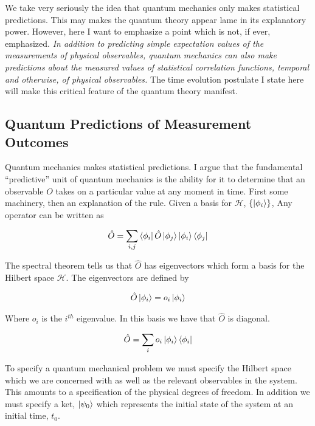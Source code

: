 \documentclass[12pt]{article}
\begin{document}
We take very seriously the idea that quantum mechanics only makes statistical predictions. This may makes the quantum theory appear lame in its explanatory power. However, here I want to emphasize a point which is not, if ever, emphasized. \textit{In addition to predicting simple expectation values of the measurements of physical observables, quantum mechanics can also make predictions about the measured values of statistical correlation functions, temporal and otherwise, of physical observables.} The time evolution postulate I state here will make this critical feature of the quantum theory manifest.

\subsection{Quantum Predictions of Measurement Outcomes}

Quantum mechanics makes statistical predictions. I argue that the fundamental ``predictive'' unit of quantum mechanics is the ability for it to determine that an observable $O$ takes on a particular value at any moment in time. First some machinery, then an explanation of the rule. Given a basis for $\mathcal{H}$, $\{\ket{\phi_i}\}$, Any operator can be written as

\begin{align}
\hat{O} = \sum_{i,j} \bra{\phi_i}\hat{O}\ket{\phi_j} \ket{\phi_i}\bra{\phi_j}
\end{align}

 The spectral theorem tells us that $\hat{O}$ has eigenvectors which form a basis for the Hilbert space $\mathcal{H}$. The eigenvectors are defined by

\begin{align}
\hat{O} \ket{\phi_i} = o_i \ket{\phi_i}
\end{align}

Where $o_i$ is the $i^{th}$ eigenvalue. In this basis we have that $\hat{O}$ is diagonal.

\begin{align}
\hat{O} = \sum_i o_i \ket{\phi_i}\bra{\phi_i}
\end{align}

To specify a quantum mechanical problem we must specify the Hilbert space which we are concerned with as well as the relevant observables in the system. This amounts to a specification of the physical degrees of freedom. In addition we must specify a ket, $\ket{\psi_0}$ which represents the initial state of the system at an initial time, $t_0$.
\end{document}

